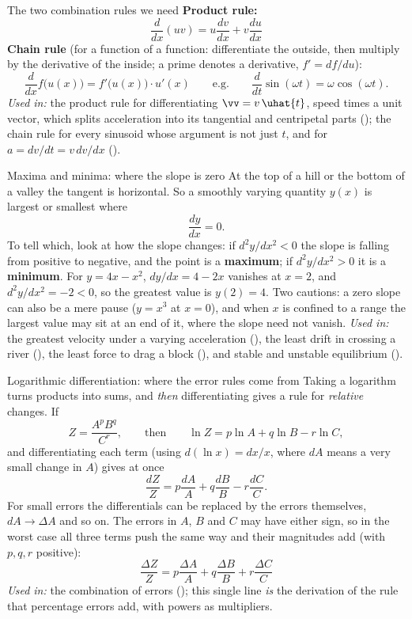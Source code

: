 \begin{methodbox}{The two combination rules we need}
\textbf{Product rule:}
\[
\frac{d}{dx}(uv)=u\frac{dv}{dx}+v\frac{du}{dx}
\]
\textbf{Chain rule} (for a function of a function: differentiate the outside, then multiply by the
derivative of the inside; a prime denotes a derivative, $f'=df/du$):
\[
\frac{d}{dx}f\big(u(x)\big)=f'\big(u(x)\big)\cdot u'(x)
\qquad\text{e.g.}\qquad
\frac{d}{dt}\sin(\omega t)=\omega\cos(\omega t).
\]
\emph{Used in:} the product rule for differentiating $\vv=v\,\uhat{t}$, speed times a unit vector, which
splits acceleration into its tangential and centripetal parts (); the chain rule for
every sinusoid whose argument is not just $t$, and for $a=dv/dt=v\,dv/dx$ ().
\end{methodbox}

\begin{defbox}{Maxima and minima: where the slope is zero}
At the top of a hill or the bottom of a valley the tangent is horizontal. So a smoothly varying
quantity $y(x)$ is largest or smallest where
\[
\frac{dy}{dx}=0.
\]
To tell which, look at how the slope changes: if $d^{2}y/dx^{2}<0$ the slope is falling from positive to
negative, and the point is a \textbf{maximum}; if $d^{2}y/dx^{2}>0$ it is a \textbf{minimum}. For
$y=4x-x^{2}$, $dy/dx=4-2x$ vanishes at $x=2$, and $d^{2}y/dx^{2}=-2<0$, so the greatest value is
$y(2)=4$. Two cautions: a zero slope can also be a mere pause ($y=x^{3}$ at $x=0$), and when $x$ is
confined to a range the largest value may sit at an end of it, where the slope need not vanish.
\emph{Used in:} the greatest velocity under a varying acceleration (), the least
drift in crossing a river (), the least force to drag a block (),
and stable and unstable equilibrium ().
\end{defbox}

\begin{methodbox}{Logarithmic differentiation: where the error rules come from}
Taking a logarithm turns products into sums, and \emph{then} differentiating gives a rule for
\emph{relative} changes. If
\[
Z=\frac{A^{p}B^{q}}{C^{r}},\qquad\text{then}\qquad \ln Z=p\ln A+q\ln B-r\ln C,
\]
and differentiating each term (using $d(\ln x)=dx/x$, where $dA$ means a very small change in $A$)
gives at once
\[
\frac{dZ}{Z}=p\frac{dA}{A}+q\frac{dB}{B}-r\frac{dC}{C}.
\]
For small errors the differentials can be replaced by the errors themselves, $dA\to\Delta A$ and so on.
The errors in $A$, $B$ and $C$ may have either sign, so in the worst case all three terms push the same
way and their magnitudes add (with $p,q,r$ positive):
\[
\boxed{\;\frac{\Delta Z}{Z}=p\frac{\Delta A}{A}+q\frac{\Delta B}{B}+r\frac{\Delta C}{C}\;}
\]
\emph{Used in:} the combination of errors (); this single line \emph{is} the derivation of the
rule that percentage errors add, with powers as multipliers.
\end{methodbox}

